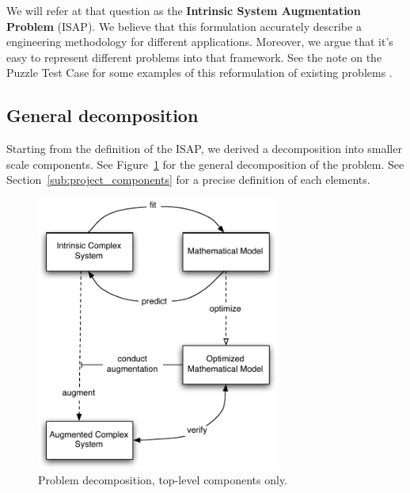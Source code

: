 \documentclass[letterpaper, oneside]{article}
\begin{document}
We will refer at that question as the \textbf{Intrinsic System Augmentation Problem} (ISAP). We believe that this formulation accurately describe a engineering methodology for different applications. Moreover, we argue that it's easy to represent different problems into that framework. See the note on the Puzzle Test Case for some examples of this reformulation of existing problems \cite{Matthey:2008rm}.

\subsection{General decomposition} %
\label{sub:general_decomposition}
Starting from the definition of the ISAP, we derived a decomposition into smaller scale components. See Figure~\ref{fig:general_decomposition} for the general decomposition of the problem. See Section~\ref{sub:project_components} for a precise definition of each elements.

\begin{figure}[ht!]
	\centering
		\includegraphics[width=8cm]{img/general_decomposition.pdf}
	\caption{Problem decomposition, top-level components only.}
	\label{fig:general_decomposition}
\end{figure}
\end{document}
